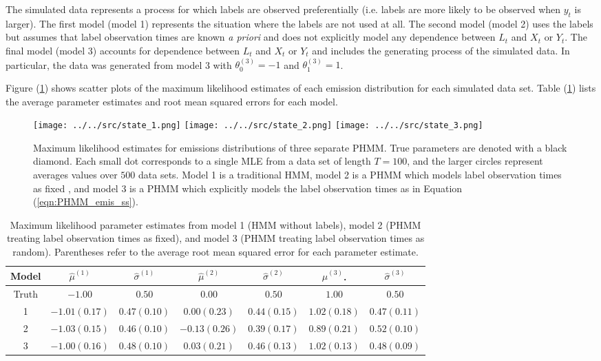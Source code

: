 The simulated data represents a process for which labels are observed preferentially (i.e. labels are more likely to be observed when $y_t$ is larger). The first model (model 1) represents the situation where the labels are not used at all. The second model (model 2) uses the labels but assumes that label observation times are known \textit{a priori} and does not explicitly model any dependence between $L_t$ and $X_t$ or $Y_t$. The final model (model 3) accounts for dependence between $L_t$ and $X_t$ or $Y_t$ and includes the generating process of the simulated data. In particular, the data was generated from model 3 with $\theta^{(3)}_0 = -1$ and $\theta^{(3)}_1 = 1$.

Figure (\ref{fig:EDA_PHMM}) shows scatter plots of the maximum likelihood estimates of each emission distribution for each simulated data set. Table (\ref{tbl:EDA_PHMM}) lists the average parameter estimates and root mean squared errors for each model.
%
\begin{figure}
    \centering
    \texttt{[image: ../../src/state\_1.png]}
    \texttt{[image: ../../src/state\_2.png]}
    \texttt{[image: ../../src/state\_3.png]}
    \caption{Maximum likelihood estimates for emissions distributions of three separate PHMM. True parameters are denoted with a black diamond. Each small dot corresponds to a single MLE from a data set of length $T=100$, and the larger circles represent averages values over $500$ data sets. Model 1 is a traditional HMM, model 2 is a PHMM which models label observation times as fixed \citep{McClintock:2018}, and model 3 is a PHMM which explicitly models the label observation times as in Equation (\ref{eqn:PHMM_emis_ss}).}
    \label{fig:EDA_PHMM}
\end{figure}
%
\begin{table}
\centering
\begin{tabular}{c|cc|cc|cc}
Model & $\hat \mu^{(1)}$ & $\hat \sigma^{(1)}$ & $\hat \mu^{(2)}$ & $\hat \sigma^{(2)}$ & $\hat \mu^{(3)}$.       & $\hat \sigma^{(3)}$ \\ \hline
Truth & $-1.00$          & $0.50$              & $0.00$           & $0.50$              & $1.00$                  & $0.50$              \\
1     & $-1.01 (0.17)$   & $0.47 (0.10)$       & $0.00 (0.23)$    & $0.44 (0.15)$       & $1.02 (0.18)$           & $0.47 (0.11)$     \\
2     & $-1.03 (0.15)$   & $0.46 (0.10)$       & $-0.13 (0.26)$   & $0.39 (0.17)$       & $0.89 (0.21)$           & $0.52 (0.10)$     \\
3     & $-1.00 (0.16)$   & $0.48 (0.10)$       & $0.03 (0.21)$    & $0.46 (0.13)$       & $1.02 (\mathbf{0.13})$  & $0.48 (0.09)$
\end{tabular}
\caption{Maximum likelihood parameter estimates from model 1 (HMM without labels), model 2 (PHMM treating label observation times as fixed), and model 3 (PHMM treating label observation times as random). Parentheses refer to the average root mean squared error for each parameter estimate.}
\label{tbl:EDA_PHMM}
\end{table}
